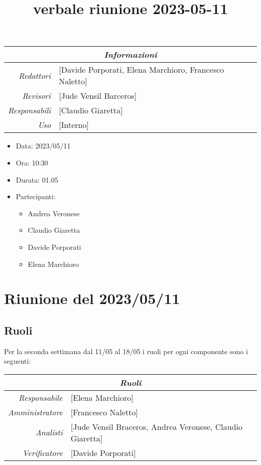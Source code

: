 \documentclass[12pt]{article}
\begin{document}
\graphicspath{ {../../templates/img} }

\title{verbale riunione 2023-05-11}

\firstPage
\maketitle

\begin{center}
\begin{tabular}{r | l}
    \multicolumn{2}{c}{\textit{Informazioni}}\\
    \hline
    
        \textit{Redattori} &
        [Davide Porporati, Elena Marchioro, Francesco Naletto]\makecell{}\\
        \textit{Revisori} &
        [Jude Vensil Barceros]\makecell{}\\
        \textit{Responsabili} &
        [Claudio Giaretta]\makecell{}\\
            \textit{Uso} & 
            [Interno]\makecell{}\\
\end{tabular}
    \begin{itemize}
    \item[] Data: 2023/05/11
    \item[] Ora: 10:30
    \item[] Durata: 01.05
    \item[] Partecipanti:
    \begin{itemize}
    \item[] Andrea Veronese
    \item[] Claudio Giaretta
    \item[] Davide Porporati
    \item[] Elena Marchioro
    \end{itemize}
    \end{itemize}
\end{center}


\tableofcontents
\printindex 
\section{Riunione del 2023/05/11}
\subsection{Ruoli}
Per la seconda settimana dal 11/05 al 18/05 i ruoli per ogni componente sono i seguenti:
\\
\begin{tabular}{r | l}
    \multicolumn{2}{c}{\textit{Ruoli}}\\
    \hline
        \textit{Responsabile} &
        [Elena Marchioro]\makecell{}\\
        \textit{Amministratore} &
        [Francesco Naletto]\makecell{}\\
        \textit{Analisti} &
        [Jude Vensil Braceros, Andrea Veronese, Claudio Giaretta]\makecell{}\\
        \textit{Verificatore} & 
        [Davide Porporati]\makecell{}\\
\end{tabular}
\end{document}
